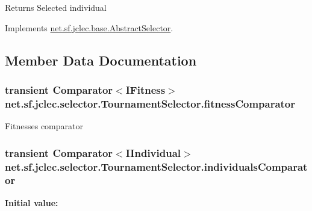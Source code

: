 \begin{DoxyReturn}{Returns}
Selected individual
\end{DoxyReturn}
 

Implements \hyperlink{classnet_1_1sf_1_1jclec_1_1base_1_1_abstract_selector_aa2ccb539c608db9c14ebbc763807b95a}{net.\-sf.\-jclec.\-base.\-Abstract\-Selector}.



\subsection{Member Data Documentation}
\hypertarget{classnet_1_1sf_1_1jclec_1_1selector_1_1_tournament_selector_ab79554e1f4154351de34d64bb5827746}{
\subsubsection[{fitness\-Comparator}]{\setlength{\rightskip}{0pt plus 5cm}transient Comparator$<${\bf I\-Fitness}$>$ net.\-sf.\-jclec.\-selector.\-Tournament\-Selector.\-fitness\-Comparator\hspace{0.3cm}{\ttfamily [protected]}}}\label{classnet_1_1sf_1_1jclec_1_1selector_1_1_tournament_selector_ab79554e1f4154351de34d64bb5827746}
Fitnesses comparator \hypertarget{classnet_1_1sf_1_1jclec_1_1selector_1_1_tournament_selector_ae0028624863cd228d8b64a12f942447a}{
\subsubsection[{individuals\-Comparator}]{\setlength{\rightskip}{0pt plus 5cm}transient Comparator$<${\bf I\-Individual}$>$ net.\-sf.\-jclec.\-selector.\-Tournament\-Selector.\-individuals\-Comparator\hspace{0.3cm}{\ttfamily [protected]}}}\label{classnet_1_1sf_1_1jclec_1_1selector_1_1_tournament_selector_ae0028624863cd228d8b64a12f942447a}
{\bfseries Initial value\-:}
